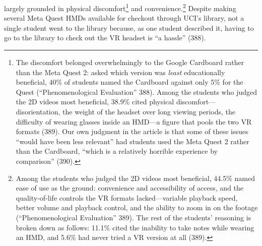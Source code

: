 largely grounded in physical discomfort\footnote{The discomfort belonged
overwhelmingly to the Google Cardboard rather than the Meta Quest 2: asked which
version was \textit{least} educationally beneficial, 40\% of students named the
Cardboard against only 5\% for the Quest (``Phenomenological Evaluation'' 388).
Among the students who judged the 2D videos most beneficial, 38.9\% cited
physical discomfort---disorientation, the weight of the headset over long
viewing periods, the difficulty of wearing glasses inside an HMD---a figure that
pools the two VR formats (389). Our own judgment in the article is that some of
these issues ``would have been less relevant'' had students used the Meta
Quest 2 rather than the Cardboard, ``which is a relatively horrible experience
by comparison'' (390).} and convenience.\footnote{Among the students who judged
the 2D videos most beneficial, 44.5\% named ease of use as the ground:
convenience and accessibility of access, and the quality-of-life controls the VR
formats lacked---variable playback speed, better volume and playback control,
and the ability to zoom in on the footage (``Phenomenological Evaluation'' 389).
The rest of the students' reasoning is broken down as follows: 11.1\% cited the
inability to take notes while wearing an HMD, and 5.6\% had never tried a VR
version at all (389).} Despite making several Meta Quest HMDs available for
checkout through UCI's library, not a single student went to the library
because, as one student described it, having to go to the library to check out
the VR headset is ``a hassle'' (388).


